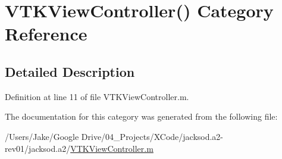 \hypertarget{category_v_t_k_view_controller_07_08}{\section{V\+T\+K\+View\+Controller() Category Reference}
\label{category_v_t_k_view_controller_07_08}
}


\subsection{Detailed Description}


Definition at line 11 of file V\+T\+K\+View\+Controller.\+m.



The documentation for this category was generated from the following file\+:\begin{DoxyCompactItemize}
\item 
/\+Users/\+Jake/\+Google Drive/04\+\_\+\+Projects/\+X\+Code/jacksod.\+a2-\/rev01/jacksod.\+a2/\hyperlink{_v_t_k_view_controller_8m}{V\+T\+K\+View\+Controller.\+m}\end{DoxyCompactItemize}
